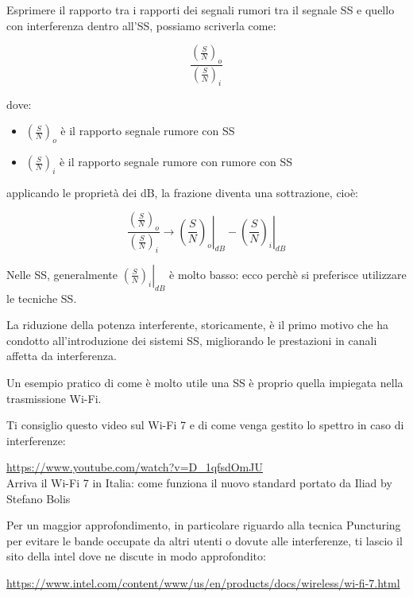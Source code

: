 Esprimere il rapporto tra i rapporti dei segnali rumori tra il segnale SS e quello con interferenza dentro all'SS, 
possiamo scriverla come: 

{
    \Large 
    \begin{equation}
        \frac{\left( \frac{S}{N} \right)_o}{\left( \frac{S}{N} \right)_i}
    \end{equation}
}

dove: 

\begin{itemize}
    \item $\left( \frac{S}{N} \right)_o$ è il rapporto segnale rumore con SS 
    \item $\left( \frac{S}{N} \right)_i$ è il rapporto segnale rumore con rumore con SS
\end{itemize}

applicando le proprietà dei dB, 
la frazione diventa una sottrazione, cioè: 

{
    \Large 
    \begin{equation}
        \frac{\left( \frac{S}{N} \right)_o}{\left( \frac{S}{N} \right)_i} 
        \to 
        \left.
        \left( \frac{S}{N} \right)_o 
        \right|_{dB}
        - 
        \left.
        \left( \frac{S}{N} \right)_i 
        \right|_{dB}
    \end{equation}
}

Nelle SS, generalmente $  \left. \left( \frac{S}{N} \right)_i \right|_{dB}$ è molto basso: 
ecco perchè si preferisce utilizzare le tecniche SS. \newline 

La riduzione della potenza interferente, storicamente, 
è il primo motivo che ha condotto all'introduzione dei sistemi SS, 
migliorando le prestazioni in canali affetta da interferenza. \newline 

\begin{tcolorbox}
Un esempio pratico di come è molto utile una SS è proprio quella impiegata nella trasmissione Wi-Fi. \newline 

Ti consiglio questo video sul Wi-Fi 7 e di come venga gestito lo spettro in caso di interferenze: \newline 

\url{https://www.youtube.com/watch?v=D_1qfsdOmJU}\\
Arriva il Wi-Fi 7 in Italia: come funziona il nuovo standard portato da Iliad by Stefano Bolis \newline 

Per un maggior approfondimento, 
in particolare riguardo alla tecnica Puncturing per evitare le bande occupate da altri utenti o dovute alle interferenze, 
ti lascio il sito della intel dove ne discute in modo approfondito: \newline 

\url{https://www.intel.com/content/www/us/en/products/docs/wireless/wi-fi-7.html}

\end{tcolorbox}

